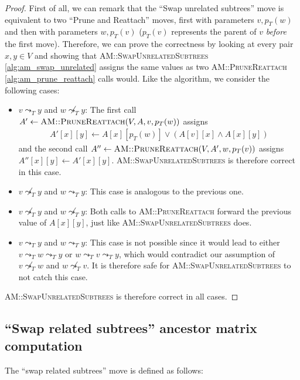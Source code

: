 \begin{proof}
    First of all, we can remark that the ``Swap unrelated subtrees'' move is equivalent to two ``Prune and Reattach'' moves, first with parameters $v, p_T(w)$ and then with parameters $w, p_T(v)$ ($p_T(v)$ represents the parent of $v$ \textit{before} the first move). Therefore, we can prove the correctness by looking at every pair $x,y \in V$ and showing that \textsc{AM::SwapUnrelatedSubtrees} \ref{alg:am_swap_unrelated} assigns the same values as two \textsc{AM::PruneReattach} \ref{alg:am_prune_reattach} calls would. Like the algorithm, we consider the following cases:
    \begin{itemize}
        \item $v \leadsto_T y$ and $w \not\leadsto_T y$: The first call $A' \leftarrow \textsc{AM::PruneReattach}(V, A, v, p_T(w))$ assigns 
        \begin{align*}
            A'[x][y] \leftarrow A[x][p_T(w)] \vee (A[v][x] \wedge A[x][y])
        \end{align*}
        and the second call $A'' \leftarrow \textsc{AM::PruneReattach}(V, A', w, p_T(v))$ assigns $A''[x][y] \leftarrow A'[x][y]$. \textsc{AM::SwapUnrelatedSubtrees} is therefore correct in this case.
        \item $v \not\leadsto_T y$ and $w \leadsto_T y$: This case is analogous to the previous one.
        \item $v \not\leadsto_T y$ and $w \not\leadsto_T y$: Both calls to \textsc{AM::PruneReattach} forward the previous value of $A[x][y]$, just like \textsc{AM::SwapUnrelatedSubtrees} does.
        \item $v \leadsto_T y$ and $w \leadsto_T y$: This case is not possible since it would lead to either $v \leadsto_T w \leadsto_T y$ or $w \leadsto_T v \leadsto_T y$, which would contradict our assumption of $v \not\leadsto_T w$ and $w \not\leadsto_T v$. It is therefore safe for \textsc{AM::SwapUnrelatedSubtrees} to not catch this case.
    \end{itemize}
    \textsc{AM::SwapUnrelatedSubtrees} is therefore correct in all cases.
\end{proof}

\subsection{``Swap related subtrees'' ancestor matrix computation}

The ``swap related subtrees'' move is defined as follows:

